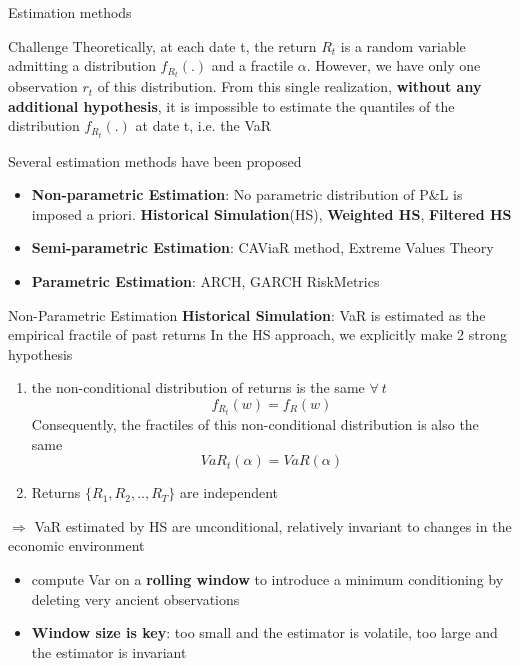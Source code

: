 \documentclass{beamer}
\newcommand{\imfbold}[1]{\textbf{\textcolor{imfblue}{#1}}}
\begin{document}
\begin{frame}{Estimation methods}
\small
\begin{block}{Challenge}
    Theoretically, at each date t, the return $R_t$ is a random variable admitting a distribution $f_{R_t}(.)$ and a fractile $\alpha$. However, we have only one observation $r_t$ of this distribution. From this single realization, \textbf{without any additional hypothesis}, it is impossible to estimate the quantiles of the distribution $f_{R_t}(.)$ at date t, i.e. the VaR
\end{block}
\pause
Several estimation methods have been proposed
    \begin{itemize}
        \item \imfbold{Non-parametric Estimation}: No parametric distribution of P\&L is imposed a priori.
        \imfbold{Historical Simulation}(HS), \textbf{Weighted HS}, \textbf{Filtered HS}
        \item \imfbold{Semi-parametric Estimation}: CAViaR method, Extreme Values Theory
        \item \imfbold{Parametric Estimation}: ARCH, GARCH RiskMetrics
    \end{itemize}
\end{frame}

\begin{frame}{Non-Parametric Estimation}
\small
 \textbf{Historical Simulation}: VaR is estimated as the empirical fractile of past returns
 In the HS approach, we explicitly make 2 strong hypothesis
 \begin{enumerate}
     \item the non-conditional distribution of returns is the same $\forall~t$
     $$f_{R_t}(w) = f_{R}(w)$$
     Consequently, the fractiles of this non-conditional distribution is also the same 
     $$VaR_t(\alpha) = VaR(\alpha)$$
     \item Returns $\{R_1, R_2, ..,R_T\}$ are independent 
 \end{enumerate}        
 $\Rightarrow$ VaR estimated by HS are unconditional, relatively invariant to changes in the economic environment
    \begin{itemize}
        \item compute Var on a \imfbold{rolling window} to introduce a minimum conditioning by deleting very ancient observations
        \item \imfbold{Window size is key}: too small and the estimator is volatile, too large and the estimator is invariant
    \end{itemize}
\end{frame}
\end{document}
